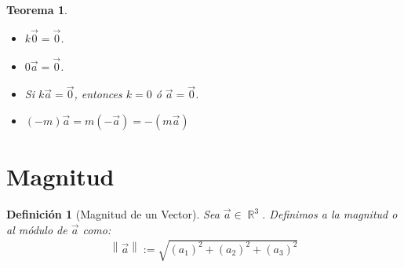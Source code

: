 \documentclass[12pt, fleqn]{report}                             %
\newenvironment{SmallIndentation}[1][0.75em]                    %
    {\begin{adjustwidth}{#1}{}\begin{footnotesize}}                 %
    {\end{footnotesize}\end{adjustwidth}}                           %
\newcommand{\Abs}[1]{\left\lVert #1 \right\lVert}               %
\newtheorem{Theorem}{Teorema}[section]                          %
\newtheorem{Definition}{Definición}[section]                    %
\newcommand{\Wrap}[1]{\left( #1 \right)}                        %
\DeclareMathOperator \Reals        {\mathbb{R}}                 %
\begin{document}
\begin{Theorem}
\begin{itemize}
            		\begin{SmallIndentation}[1em]
            			\textbf{Demostración:} de forma estratégica, añadimos $\vec{c}$ a la ecuación de forma intermedia:
            			\begin{align*}
	            			\vec{a} &= \vec{a} + \vec{0} &&\mbox{Neutro aditivo}\\
	            			&= \vec{a} + \Wrap{\vec{c} + \Wrap{-\vec{c}} } &&\mbox{Inverso aditivo}\\
	            			&= \Wrap{\vec{a} + \vec{c}} + \Wrap{-\vec{c}} &&\mbox{Propiedad asociativa}\\
	            			&= \Wrap{\vec{b} + \vec{c}} + \Wrap{-\vec{c}} &&\mbox{Hipótesis}\\
	            			&= \vec{b} + \Wrap{\vec{c} + \Wrap{-\vec{c}} } &&\mbox{Propiedad asociativa}\\
	            			&= \vec{b} + \vec{0} &&\mbox{Inverso aditivo}\\
	            			&= \vec{b} &&\mbox{Neutro aditivo}
            			\end{align*}
            		\end{SmallIndentation}
            		
            		\item $k\vec{0} = \vec{0}$.
            		
            		\item $0\vec{a} = \vec{0}$.
            		
            		\item Si $k\vec{a}=\vec{0}$, entonces $k=0$ ó $\vec{a}=\vec{0}$.
            		
            		\item $(-m)\vec{a}=m(-\vec{a})=-(m\vec{a})$
            	\end{itemize}
            \end{Theorem}
            


        \clearpage
        \section{Magnitud}
        
            \begin{Definition}[Magnitud de un Vector]
                Sea $\vec{a} \in \Reals^3$. Definimos a la magnitud o al módulo de $\vec{a}$ como:
                \begin{align}
                    \Abs{\vec{a}} := \sqrt{(a_1)^2 + (a_2)^2 + (a_3)^2}
                \end{align}
            \end{Definition}
    
\end{document}
